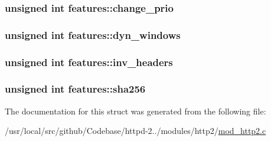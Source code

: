 \subsubsection[{\texorpdfstring{change\+\_\+prio}{change_prio}}]{\setlength{\rightskip}{0pt plus 5cm}unsigned {\bf int} features\+::change\+\_\+prio}\hypertarget{structfeatures_a015dad6bc7c9733d24c772f73236cc57}{}\label{structfeatures_a015dad6bc7c9733d24c772f73236cc57}
\subsubsection[{\texorpdfstring{dyn\+\_\+windows}{dyn_windows}}]{\setlength{\rightskip}{0pt plus 5cm}unsigned {\bf int} features\+::dyn\+\_\+windows}\hypertarget{structfeatures_a13aaf8ff9a041e9eb5697d5260fd9ffb}{}\label{structfeatures_a13aaf8ff9a041e9eb5697d5260fd9ffb}
\subsubsection[{\texorpdfstring{inv\+\_\+headers}{inv_headers}}]{\setlength{\rightskip}{0pt plus 5cm}unsigned {\bf int} features\+::inv\+\_\+headers}\hypertarget{structfeatures_abcbcbe82e6f04bc9c739e453219e4155}{}\label{structfeatures_abcbcbe82e6f04bc9c739e453219e4155}
\subsubsection[{\texorpdfstring{sha256}{sha256}}]{\setlength{\rightskip}{0pt plus 5cm}unsigned {\bf int} features\+::sha256}\hypertarget{structfeatures_afb5622b086ce261146405e97aed13595}{}\label{structfeatures_afb5622b086ce261146405e97aed13595}


The documentation for this struct was generated from the following file\+:\begin{DoxyCompactItemize}
\item 
/usr/local/src/github/\+Codebase/httpd-\/2../modules/http2/\hyperlink{mod__http2_8c}{mod\+\_\+http2.\+c}\end{DoxyCompactItemize}
